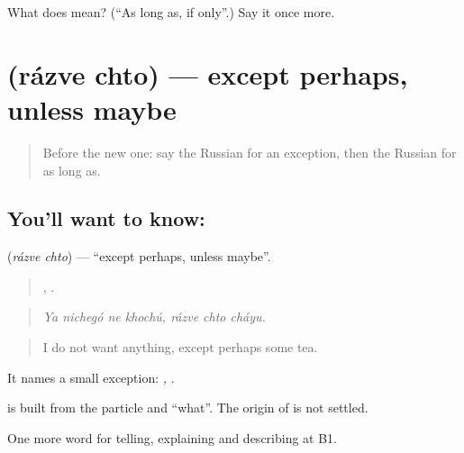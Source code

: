\begin{tcolorbox}[breakable,colback=teal!4,colframe=teal!35!black,title={Before you move on}]
What does   mean? (\textquotedblleft{}As long as, if only\textquotedblright{}.) Say it once more.
\end{tcolorbox}
\section[\texorpdfstring{\ru{разве} \ru{что} (rázve chto)}{разве что (rázve chto)}]{  (rázve chto) — except perhaps, unless maybe}

\label{lesson:RU-C376-razve-chto}



\begin{quote}
Before the new one: say the Russian for an exception, then the Russian for as long as.
\end{quote}

\subsection*{You'll want to know:  }
\textbf{ } (\emph{rázve chto}) — \textquotedblleft{}except perhaps, unless maybe\textquotedblright{}.

\begin{quote}
   ,   .
\end{quote}

\begin{quote}
\emph{Ya nichegó ne khochú, rázve chto cháyu.}
\end{quote}

\begin{quote}
I do not want anything, except perhaps some tea.
\end{quote}

It names a small exception: \emph{  ,   }.

\begin{cousinweb}
\textbf{ } is built from the particle \emph{} and \emph{} \textquotedblleft{}what\textquotedblright{}. The origin of \emph{} is not settled.
\end{cousinweb}

\begin{grammarlens}[title={What you've built}]
One more word for telling, explaining and describing at B1.
\end{grammarlens}

